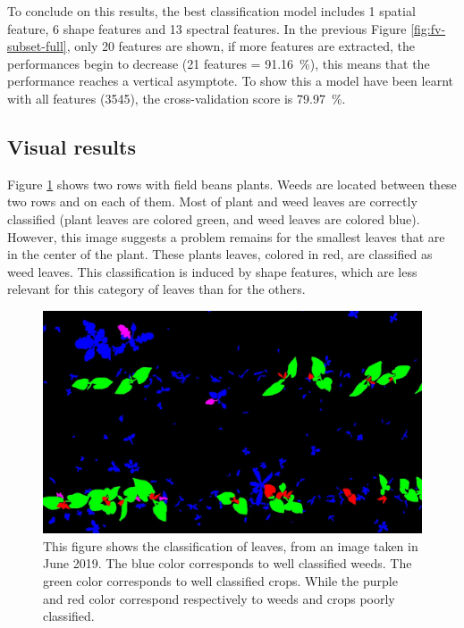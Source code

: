 \documentclass[../thesis.tex]{subfiles}
\begin{document}
    To conclude on this results, the best classification model includes 1 spatial feature, 6 shape features and 13 spectral features. In the previous Figure \ref{fig:fv-subset-full}, only 20 features are shown, if more features are extracted, the performances begin to decrease (21 features = \SI{91.16}{\percent}), this means that the performance reaches a vertical asymptote. To show this a model have been learnt with all features (3545), the cross-validation score is \SI{79.97}{\percent}.
    
    \subsection{Visual results}
    Figure \ref{fig:render-roses} shows two rows with field beans plants. Weeds are located between these two rows and on each of them. Most of plant and weed leaves are correctly classified (plant leaves are colored green, and weed leaves are colored blue). However, this image suggests a problem remains for the smallest leaves that are in the center of the plant. These plants leaves, colored in red, are classified as weed leaves. This classification is induced by shape features, which are less relevant for this category of leaves than for the others. 
    
    \begin{figure}[H]
        \centering
        \includegraphics[width=\linewidth]{img/features/rose2.jpg}
        \caption{This figure shows the classification of leaves, from an image taken in June 2019. The blue color corresponds to well classified weeds. The green color corresponds to well classified crops. While the purple and red color correspond respectively to weeds and crops poorly classified.}
        \label{fig:render-roses}
    \end{figure}
    
\end{document}
